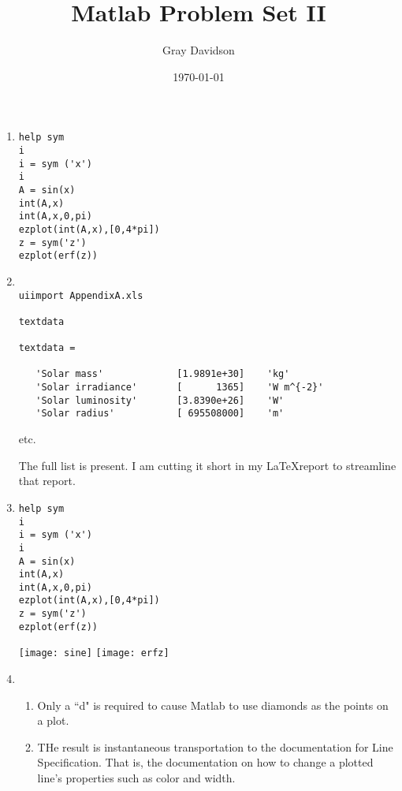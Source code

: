 \documentclass[aps,pre,nofootinbib]{revtex4}
\begin{document}
\title{Matlab Problem Set II}

\author{Gray Davidson}
\date{\today}

\maketitle

\begin{enumerate}
\item
   \begin{verbatim}
help sym
i
i = sym ('x')
i
A = sin(x)
int(A,x)
int(A,x,0,pi)
ezplot(int(A,x),[0,4*pi])
z = sym('z')
ezplot(erf(z))
\end{verbatim}

\item
\begin{verbatim}

uiimport AppendixA.xls

textdata

textdata =

   'Solar mass'             [1.9891e+30]    'kg'
   'Solar irradiance'       [      1365]    'W m^{-2}'
   'Solar luminosity'       [3.8390e+26]    'W'
   'Solar radius'           [ 695508000]    'm'

\end{verbatim}

etc.

The full list is present.  I am cutting it short in my \LaTeX report to streamline that report.

\item
  \begin{verbatim}
help sym
i
i = sym ('x')
i
A = sin(x)
int(A,x)
int(A,x,0,pi)
ezplot(int(A,x),[0,4*pi])
z = sym('z')
ezplot(erf(z))
\end{verbatim}

\texttt{[image: sine]}
\texttt{[image: erfz]}
\item

\begin{enumerate}

\item Only a ``d" is required to cause Matlab to use diamonds as the points on a plot.

\item THe result is instantaneous transportation to the documentation for Line Specification.  That is, the documentation on how to change a plotted line's properties such as color and width.


\end{enumerate}
\end{enumerate}
\end{document}
